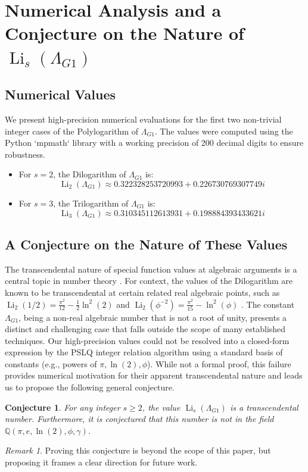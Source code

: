 \documentclass{amsart}
\theoremstyle{plain}
\newtheorem{conjecture}[theorem]{Conjecture}
\theoremstyle{definition}
\theoremstyle{remark}
\newtheorem*{remark}{Remark}
\DeclareMathOperator{\Li}{Li} %
\newcommand{\LambdaG}{\Lambda_{G1}}
\begin{document}
\section{Numerical Analysis and a Conjecture on the Nature of \texorpdfstring{$\Li_s(\LambdaG)$}{Li\_s(Lambda\_G1)}}

\subsection{Numerical Values}
We present high-precision numerical evaluations for the first two non-trivial integer cases of the Polylogarithm of $\LambdaG$. The values were computed using the Python `mpmath` library with a working precision of 200 decimal digits to ensure robustness.
\begin{itemize}
    \item For $s=2$, the Dilogarithm of $\LambdaG$ is:
    $$ \Li_2(\LambdaG) \approx 0.322328253720993 + 0.226730769307749i $$
    
    \item For $s=3$, the Trilogarithm of $\LambdaG$ is:
    $$ \Li_3(\LambdaG) \approx 0.310345112613931 + 0.198884393433621i $$
\end{itemize}

\subsection{A Conjecture on the Nature of These Values}
The transcendental nature of special function values at algebraic arguments is a central topic in number theory \cite{Baker}. For context, the values of the Dilogarithm are known to be transcendental at certain related real algebraic points, such as $\Li_2(1/2) = \frac{\pi^2}{12} - \frac{1}{2}\ln^2(2)$ and $\Li_2(\phi^{-2}) = \frac{\pi^2}{15} - \ln^2(\phi)$ \cite{Lewin}. The constant $\LambdaG$, being a non-real algebraic number that is not a root of unity, presents a distinct and challenging case that falls outside the scope of many established techniques. Our high-precision values could not be resolved into a closed-form expression by the PSLQ integer relation algorithm using a standard basis of constants (e.g., powers of $\pi, \ln(2), \phi$). While not a formal proof, this failure provides numerical motivation for their apparent transcendental nature and leads us to propose the following general conjecture.
\begin{conjecture}
For any integer $s \ge 2$, the value $\Li_s(\LambdaG)$ is a transcendental number. Furthermore, it is conjectured that this number is not in the field $\mathbb{Q}(\pi, e, \ln(2), \phi, \gamma)$.
\end{conjecture}
\begin{remark}
Proving this conjecture is beyond the scope of this paper, but proposing it frames a clear direction for future work.
\end{remark}
\end{document}
